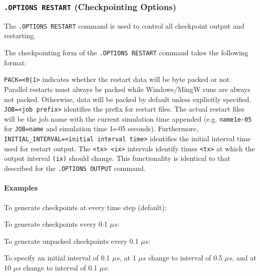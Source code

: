 \subsubsection{\texttt{.OPTIONS RESTART} (Checkpointing Options)}

The   \verb+.OPTIONS RESTART+ command is
used to control all  checkpoint output and restarting.

The checkpointing form of the \texttt{.OPTIONS RESTART} command takes the following format:

\texttt{PACK=<0|1>} indicates whether the restart data will be byte packed
or not.  Parallel restarts must always be packed while Windows/MingW
runs are always not packed.  Otherwise, data will be packed by default unless
explicitly specified.
\texttt{JOB=<job prefix>} identifies the prefix for restart files.  The
actual restart files will be the job name with the current simulation time
appended (e.g. \texttt{name1e-05} for \texttt{JOB=name} and simulation time
1e-05 seconds).  Furthermore, \texttt{INITIAL\_INTERVAL=<initial interval
  time>} identifies the initial interval time used for restart output.  The
\texttt{<tx> <ix>} intervals identify times \texttt{<tx>} at which the output
interval \texttt{(ix)} should change.  This functionality is identical to
that described for the \texttt{.OPTIONS OUTPUT} command.

\paragraph{Examples}

To generate checkpoints at every time step (default):


To generate checkpoints every 0.1 $\mu s$:


To generate unpacked checkpoints every 0.1 $\mu s$:


To specify an initial interval of 0.1 $\mu s$, at 1 $\mu s$ change to interval
of 0.5 $\mu s$, and at 10 $\mu s$ change to interval of 0.1 $\mu s$:

